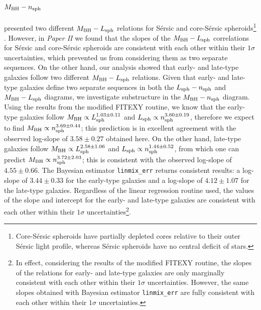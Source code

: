 \documentclass[preprint2]{emulateapj}
\begin{document}
\subsection{$M_{\rm BH} - n_{\rm sph}$}
\cite{grahamscott2013} presented two different $M_{\rm BH} - L_{\rm sph}$ relations for S\'ersic and core-S\'ersic 
spheroids\footnote{Core-S\'ersic spheroids have partially depleted cores relative to their outer S\'ersic light profile, 
whereas S\'ersic spheroids have no central deficit of stars. } \citep{graham2003coresersicmodel,trujillo2004coresersicmodel}.
However, in \emph{Paper II} we found that the slopes of the $M_{\rm BH} - L_{\rm sph}$ correlations for S\'ersic and core-S\'ersic spheroids 
are consistent with each other within their $1\sigma$ uncertainties, 
which prevented us from considering them as two separate sequences. 
On the other hand, our analysis showed that early- and late-type galaxies follow two different $M_{\rm BH} - L_{\rm sph}$ relations. 
Given that early- and late-type galaxies define two separate sequences in both the $L_{\rm sph} - n_{\rm sph}$ 
and $M_{\rm BH} - L_{\rm sph}$ diagrams, 
we investigate substructure in the $M_{\rm BH} - n_{\rm sph}$ diagram. 
Using the results from the modified FITEXY routine, 
we know that the early-type galaxies follow $M_{\rm BH} \propto L_{\rm sph}^{1.03 \pm 0.11}$ 
and $L_{\rm sph} \propto n_{\rm sph}^{3.60 \pm 0.19}$, 
therefore we expect to find $M_{\rm BH} \propto n_{\rm sph}^{3.69 \pm 0.44}$; 
this prediction is in excellent agreement with the observed log-slope of $3.58 \pm 0.27$ obtained here. 
On the other hand, late-type galaxies follow $M_{\rm BH} \propto L_{\rm sph}^{2.58 \pm 1.06}$ 
and $L_{\rm sph} \propto n_{\rm sph}^{1.44 \pm 0.52}$, 
from which one can predict $M_{\rm BH} \propto n_{\rm sph}^{3.72 \pm 2.03}$; 
this is consistent with the observed log-slope of $4.55 \pm 0.66$. 
The Bayesian estimator {\tt linmix\_err} returns consistent results: 
a log-slope of $3.44 \pm 0.33$ for the early-type galaxies 
and a log-slope of $4.12 \pm 1.07$ for the late-type galaxies. 
Regardless of the linear regression routine used, 
the values of the slope and intercept for the early- and late-type galaxies 
are consistent with each other within their $1\sigma$ uncertainties\footnote{In effect, 
considering the results of the modified FITEXY routine, 
the slopes of the relations for early- and late-type galaxies 
are only marginally consistent with each other within their $1\sigma$ uncertainties. 
However, the same slopes obtained with Bayesian estimator {\tt linmix\_err} 
are fully consistent with each other within their $1\sigma$ uncertainties. }.
\end{document}
